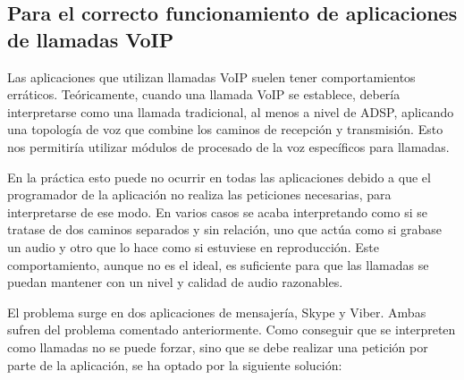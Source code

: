 \subsection{Para el correcto funcionamiento de aplicaciones de llamadas VoIP}
Las aplicaciones que utilizan llamadas \gls{VoIP} suelen tener comportamientos erráticos. Teóricamente, cuando una llamada \gls{VoIP} se establece, debería interpretarse como una llamada tradicional, al menos a nivel de \gls{ADSP}, aplicando una topología de voz que combine los caminos de recepción y transmisión. Esto nos permitiría utilizar módulos de procesado de la voz específicos para llamadas.

En la práctica esto puede no ocurrir en todas las aplicaciones debido a que el programador de la aplicación no realiza las peticiones necesarias, para interpretarse de ese modo. En varios casos se acaba interpretando como si se tratase de dos caminos separados y sin relación, uno que actúa como si grabase un audio y otro que lo hace como si estuviese en reproducción. Este comportamiento, aunque no es el ideal, es suficiente para que las llamadas se puedan mantener con un nivel y calidad de audio razonables.

El problema surge en dos aplicaciones de mensajería, Skype y Viber. Ambas sufren del problema comentado anteriormente. Como conseguir que se interpreten como llamadas no se puede forzar, sino que se debe realizar una petición por parte de la aplicación, se ha optado por la siguiente solución:
	
